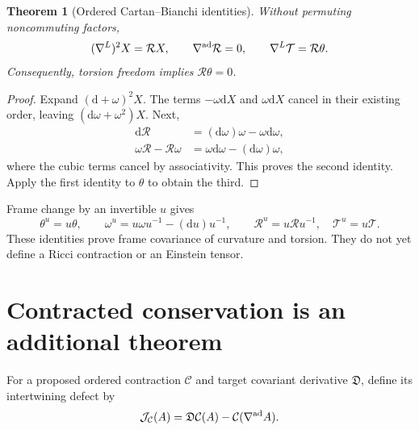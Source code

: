 \documentclass[11pt,a4paper,oneside]{book}
\theoremstyle{plain}
\newtheorem{theorem}{Theorem}[chapter]
\theoremstyle{definition}
\theoremstyle{remark}
\newcommand{\dd}{\mathrm d}
\begin{document}
\begin{theorem}[Ordered Cartan--Bianchi identities]
\label{thm:cartan}
Without permuting noncommuting factors,
\begin{equation}
 (\nabla^L)^2X=\mathcal RX,\qquad
 \nabla^{\rm ad}\mathcal R=0,\qquad
 \nabla^L\mathcal T=\mathcal R\theta.
 \label{eq:cartan-bianchi}
\end{equation}
Consequently, torsion freedom implies $\mathcal R\theta=0$.
\end{theorem}
\begin{proof}
Expand $(\dd+\omega)^2X$. The terms $-\omega\dd X$ and $\omega\dd X$ cancel in their existing order, leaving $(\dd\omega+\omega^2)X$. Next,
\begin{align*}
 \dd\mathcal R&=(\dd\omega)\omega-\omega\dd\omega,\\
 \omega\mathcal R-\mathcal R\omega
 &=\omega\dd\omega-(\dd\omega)\omega,
\end{align*}
where the cubic terms cancel by associativity. This proves the second identity. Apply the first identity to $\theta$ to obtain the third.
\end{proof}
\cite{R13}
Frame change by an invertible $u$ gives
\begin{equation}
 \theta^u=u\theta,\qquad
 \omega^u=u\omega u^{-1}-(\dd u)u^{-1},\qquad
 \mathcal R^u=u\mathcal Ru^{-1},\quad \mathcal T^u=u\mathcal T.
\end{equation}
These identities prove frame covariance of curvature and torsion. They do not yet define a Ricci contraction or an Einstein tensor.

\section{Contracted conservation is an additional theorem}
For a proposed ordered contraction $\mathcal C$ and target covariant derivative $\mathfrak D$, define its intertwining defect by
\begin{equation}
 \mathcal J_{\mathcal C}(A)
 =\mathfrak D\mathcal C(A)-\mathcal C(\nabla^{\rm ad}A).
 \label{eq:contraction-defect}
\end{equation}
\end{document}
